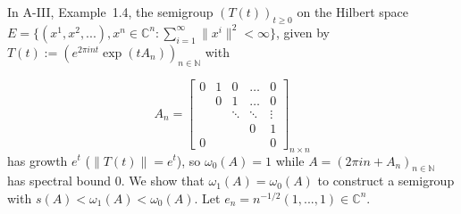 \begin{example}\label{ex:a4-1.6} In A-III, Example~1.4, the semigroup $ (T(t))_{t \geq 0} $ on the Hilbert space $ E = \{(x^1, x^2, ...), x^n \in \mathbb{C}^n : \sum_{i=1}^{\infty} \|x^i\|^2 < \infty\} $, given by $ T(t) := (e^{2\pi i n t} \exp(t A_n))_{n \in \mathbb{N}} $ with  

\[
A_n =
\begin{bmatrix}
0 & 1 & 0 & \dots & 0 \\
& 0 & 1 & \dots & 0 \\
& & \ddots & \ddots & \vdots \\
& & & 0 & 1 \\
0 & & & & 0
\end{bmatrix}_{n \times n}
\]
has growth $ e^t $ (\ie $ \|T(t)\| = e^t $), so $ \omega_0(A) = 1 $ while $ A = (2\pi i n + A_n)_{n \in \mathbb{N}} $ has spectral bound $ 0 $. 
We show that $ \omega_1(A) = \omega_0(A) $ to construct a semigroup with $ s(A) < \omega_1(A) < \omega_0(A) $. 
Let $ e_n = n^{-1/2} (1, ..., 1) \in \mathbb{C}^n $. 


\end{example}
